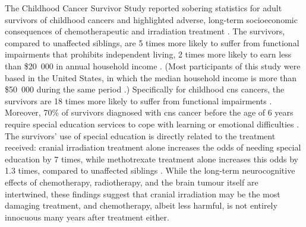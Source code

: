 The Childhood Cancer Survivor Study reported sobering statistics for adult survivors of childhood cancers and highlighted adverse, long-term socioeconomic consequences of chemotherapeutic and irradiation treatment . The survivors, compared to unaffected siblings, are 5 times more likely to suffer from functional impairments that prohibits independent living, 2 times more likely to earn less than \$20~000 in annual household income . (Most participants of this study were based in the United States, in which the median household income is more than \$50~000 during the same period .) Specifically for childhood \gls{cns} cancers, the survivors are 18 times more likely to suffer from functional impairments . Moreover, 70\% of survivors diagnosed with \gls{cns} cancer before the age of 6 years require special education services to cope with learning or emotional difficulties . The survivors' use of special education is directly related to the treatment received: cranial irradiation treatment alone increases the odds of needing special education by 7 times, while methotrexate treatment alone increases this odds by 1.3 times, compared to unaffected siblings . While the long-term neurocognitive effects of chemotherapy, radiotherapy, and the brain tumour itself are intertwined, these findings suggest that cranial irradiation may be the most damaging treatment, and chemotherapy, albeit less harmful, is not entirely innocuous many years after treatment either.


